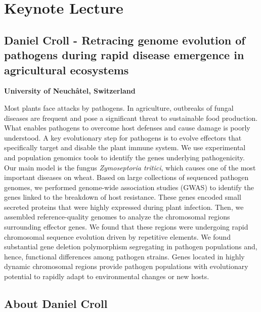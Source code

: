 \documentclass[12pt,]{book}
\theoremstyle{definition}
\theoremstyle{definition}
\theoremstyle{remark}
\begin{document}
\section*{Keynote Lecture}\label{keynote-lecture-5}

\subsection*{Daniel Croll - Retracing genome evolution of pathogens
during rapid disease emergence in agricultural
ecosystems}\label{daniel-croll---retracing-genome-evolution-of-pathogens-during-rapid-disease-emergence-in-agricultural-ecosystems}

\textbf{University of Neuchâtel, Switzerland}

Most plants face attacks by pathogens. In agriculture, outbreaks of
fungal diseases are frequent and pose a significant threat to
sustainable food production. What enables pathogens to overcome host
defenses and cause damage is poorly understood. A key evolutionary step
for pathogens is to evolve effectors that specifically target and
disable the plant immune system. We use experimental and population
genomics tools to identify the genes underlying pathogenicity. Our main
model is the fungus \emph{Zymoseptoria tritici}, which causes one of the
most important diseases on wheat. Based on large collections of
sequenced pathogen genomes, we performed genome-wide association studies
(GWAS) to identify the genes linked to the breakdown of host resistance.
These genes encoded small secreted proteins that were highly expressed
during plant infection. Then, we assembled reference-quality genomes to
analyze the chromosomal regions surrounding effector genes. We found
that these regions were undergoing rapid chromosomal sequence evolution
driven by repetitive elements. We found substantial gene deletion
polymorphism segregating in pathogen populations and, hence, functional
differences among pathogen strains. Genes located in highly dynamic
chromosomal regions provide pathogen populations with evolutionary
potential to rapidly adapt to environmental changes or new hosts.

\subsection*{About Daniel Croll}\label{about-daniel-croll}
\end{document}

